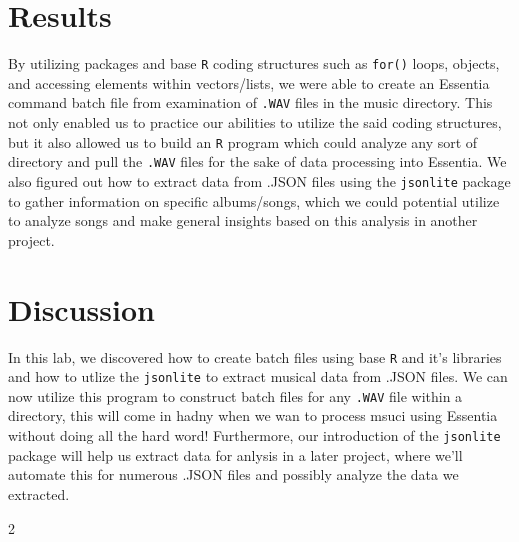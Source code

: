 \documentclass{article}\usepackage[]{graphicx}\usepackage[]{xcolor}
\begin{document}
\begin{multicols}{2}
\section{Results}
By utilizing packages and base \texttt{R} coding structures such as \texttt{for()} loops, objects, and accessing
elements within vectors/lists, we were able to create an Essentia command batch file from examination of 
\texttt{.WAV} files in the music directory. This not only enabled us to practice our abilities to utilize the said
coding structures, but it also allowed us to build an \texttt{R} program which could analyze any sort of directory
and pull the \texttt{.WAV} files for the sake of data processing into Essentia. We also figured out how to extract
data from .JSON files using the \texttt{jsonlite} package to gather information on specific albums/songs, which we could potential utilize to analyze songs and make general insights based on this analysis in another project.

\section{Discussion}
In this lab, we discovered how to create batch files using base \texttt{R} and it's libraries and how to utlize the \texttt{jsonlite} to extract musical data from .JSON files. We can now utilize this program to construct batch files for any \texttt{.WAV} file within a directory, this will come in hadny when we wan to process msuci using Essentia without doing all the hard word! Furthermore, our introduction of the \texttt{jsonlite} package will help us extract data for anlysis in a later project, where we'll automate this for numerous .JSON files and possibly analyze the data we extracted.




\begin{footnotesize}

\end{footnotesize}

\end{multicols}{2}
\end{document}
